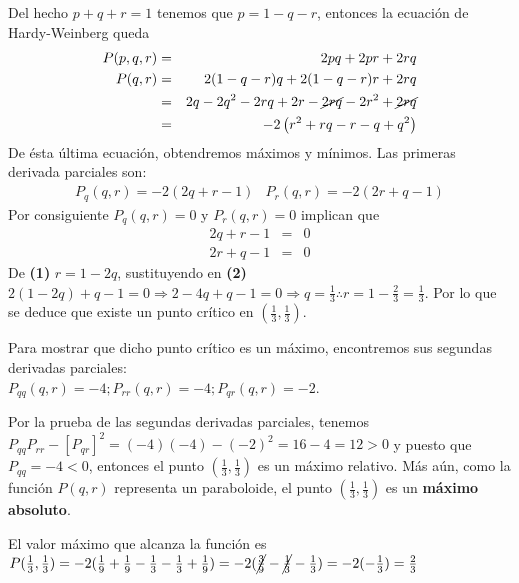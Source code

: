 \documentclass{article}
\begin{document}
\begin{enumerate}
{                \color{azul}
                Del hecho $p+q+r=1$ tenemos que $p=1-q-r$, entonces la ecuación de
                Hardy-Weinberg queda
                \begin{eqnarray*}
                    P(p,q,r) & = & 2pq+2pr+2rq\\
                    P(q,r)   & = & 2(1-q-r)q+2(1-q-r)r+2rq\\
                             & = & 2q-2q^2-2rq+2r-\cancel{2rq}-2r^2+\cancel{2rq}\\
                             & = & -2\left(r^2+rq-r-q+q^2\right)
                \end{eqnarray*}
                De ésta última ecuación, obtendremos máximos y mínimos. Las primeras derivada
                parciales son:
                \begin{eqnarray*}
                    P_q(q,r)=-2\left(2q+r-1\right) &
                    P_r(q,r)=-2\left(2r+q-1\right)
                \end{eqnarray*}
                Por consiguiente $P_q(q,r)=0$ y $P_r(q,r)=0$ implican que
                \begin{eqnarray}
                    2q+r-1 & = & 0\\
                    2r+q-1 & = & 0
                \end{eqnarray}
                De {\bf\color{rojo} (1)} $r=1-2q$, sustituyendo en {\bf\color{rojo} (2)} $2(1-2q)+q-1=0 \Rightarrow 2-4q+q-1=0
                \Rightarrow q=\frac{1}{3} \therefore r=1-\frac{2}{3}=\frac{1}{3}$. Por lo
                que se deduce que existe un punto crítico en $(\frac{1}{3},\frac{1}{3})$.

                Para mostrar que dicho punto crítico es un máximo, encontremos sus segundas
                derivadas parciales:\\$P_{qq}(q,r)=-4;P_{rr}(q,r)=-4;P_{qr}(q,r)=-2$.

                Por la prueba de las segundas derivadas parciales, tenemos
                $P_{qq}P_{rr}-[P_{qr}]^2=(-4)(-4)-(-2)^2=16-4=12>0$ y puesto que $P_{qq}=-4<0$,
                entonces el punto $(\frac{1}{3},\frac{1}{3})$ es un máximo relativo. Más aún,
                como la función $P(q,r)$ representa un paraboloide, el punto $(\frac{1}{3},
                \frac{1}{3})$ es un {\bf máximo absoluto}.

                El valor máximo que alcanza la función es $P(\frac{1}{3},\frac{1}{3})=
                -2(\frac{1}{9}+\frac{1}{9}-\frac{1}{3}-\frac{1}{3}+\frac{1}{9})=
                -2(\cancel{\frac{3}{9}}-\cancel{\frac{1}{3}}-\frac{1}{3})=
                -2(-\frac{1}{3})=\frac{2}{3}$

}
\end{enumerate}
\end{document}
